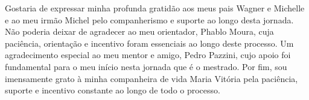 Gostaria de expressar minha profunda gratidão aos meus pais Wagner e Michelle e ao meu irmão Michel pelo companherismo e suporte ao longo desta jornada. Não poderia deixar de agradecer ao meu orientador, Phablo Moura, cuja paciência, orientação e incentivo foram essenciais ao longo deste processo. Um agradecimento especial ao meu mentor e amigo, Pedro Pazzini, cujo apoio foi fundamental para o meu início nesta jornada que é o mestrado. Por fim, sou imensamente grato à minha companheira de vida Maria Vitória pela paciência, suporte e incentivo constante ao longo de todo o processo.
